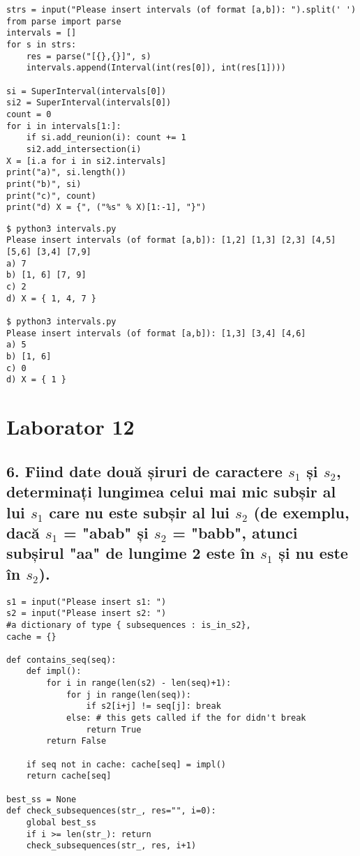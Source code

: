 \documentclass[11pt]{article}
\begin{document}
\begin{itemize}
\begin{itemize}
\begin{verbatim}
strs = input("Please insert intervals (of format [a,b]): ").split(' ')
from parse import parse
intervals = []
for s in strs:
    res = parse("[{},{}]", s)
    intervals.append(Interval(int(res[0]), int(res[1])))

si = SuperInterval(intervals[0])
si2 = SuperInterval(intervals[0])
count = 0
for i in intervals[1:]:
    if si.add_reunion(i): count += 1
    si2.add_intersection(i)
X = [i.a for i in si2.intervals]
print("a)", si.length())
print("b)", si)
print("c)", count)
print("d) X = {", ("%s" % X)[1:-1], "}")
\end{verbatim}

\begin{verbatim}
$ python3 intervals.py
Please insert intervals (of format [a,b]): [1,2] [1,3] [2,3] [4,5] [5,6] [3,4] [7,9]
a) 7
b) [1, 6] [7, 9] 
c) 2
d) X = { 1, 4, 7 }

$ python3 intervals.py
Please insert intervals (of format [a,b]): [1,3] [3,4] [4,6]
a) 5
b) [1, 6] 
c) 0
d) X = { 1 }
\end{verbatim}

\section*{Laborator 12}
\label{sec:org9d21c2c}
\subsection*{6. Fiind date două șiruri de caractere \(s_1\) și \(s_2\), determinați lungimea celui mai mic subșir al lui \(s_1\) care nu este subșir al lui \(s_2\) (de exemplu, dacă \(s_1\) = "abab" și \(s_2\) = "babb", atunci subșirul "aa" de lungime 2 este în \(s_1\) și nu este în \(s_2\)).}
\label{sec:org849f528}
\begin{verbatim}
s1 = input("Please insert s1: ")
s2 = input("Please insert s2: ")
#a dictionary of type { subsequences : is_in_s2},
cache = {}

def contains_seq(seq):
    def impl():
        for i in range(len(s2) - len(seq)+1):
            for j in range(len(seq)):
                if s2[i+j] != seq[j]: break
            else: # this gets called if the for didn't break
                return True
        return False

    if seq not in cache: cache[seq] = impl()
    return cache[seq]

best_ss = None
def check_subsequences(str_, res="", i=0):
    global best_ss
    if i >= len(str_): return
    check_subsequences(str_, res, i+1)


\end{verbatim}
\end{itemize}
\end{itemize}
\end{document}
